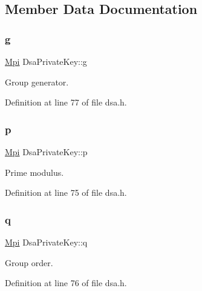 \subsection{Member Data Documentation}
\mbox{\label{structDsaPrivateKey_a78da170adbc7f1a7eeb95e6bc52d4124}} 
\subsubsection{\texorpdfstring{g}{g}}
{\footnotesize\ttfamily \hyperlink{structMpi}{Mpi} Dsa\+Private\+Key\+::g}



Group generator. 



Definition at line 77 of file dsa.\+h.

\mbox{\label{structDsaPrivateKey_a8f8fd999b327a6bbff828cb04e31772e}} 
\subsubsection{\texorpdfstring{p}{p}}
{\footnotesize\ttfamily \hyperlink{structMpi}{Mpi} Dsa\+Private\+Key\+::p}



Prime modulus. 



Definition at line 75 of file dsa.\+h.

\mbox{\label{structDsaPrivateKey_a57748f022f498aaf35d7b30f562af7ca}} 
\subsubsection{\texorpdfstring{q}{q}}
{\footnotesize\ttfamily \hyperlink{structMpi}{Mpi} Dsa\+Private\+Key\+::q}



Group order. 



Definition at line 76 of file dsa.\+h.

\mbox{\label{structDsaPrivateKey_ac5b101c89f19f59b4cddd85429f1c30e}} 
